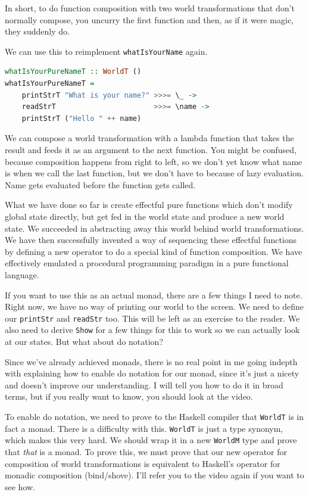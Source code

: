 \documentclass[11pt]{article}
\begin{document}
In short, to do function composition with two world transformations that don't
normally compose, you uncurry the first function and then, as if it were magic,
they suddenly do.

We can use this to reimplement \texttt{whatIsYourName} again.
\begin{lstlisting}[language=Haskell]
whatIsYourPureNameT :: WorldT ()
whatIsYourPureNameT =
    printStrT "What is your name?" >>>= \_ ->
    readStrT                       >>>= \name ->
    printStrT ("Hello " ++ name)
\end{lstlisting}
We can compose a world transformation with a lambda function that takes the result
and feeds it as an argument to the next function. You might be confused,
because composition happens from right to left, so we don't yet know what name
is when we call the last function, but we don't have to because of lazy
evaluation. Name gets evaluated before the function gets called.

What we have done so far is create effectful pure functions which don't modify
global state directly, but get fed in the world state and produce a new world
state. We succeeded in abstracting away this world behind world
transformations. We have then successfully invented a way of sequencing these
effectful functions by defining a new operator to do a special kind of function
composition. We have effectively emulated a procedural programming paradigm in
a pure functional language.

If you want to use this as an actual monad, there are a few things I need to
note. Right now, we have no way of printing our world to the screen. We need to
define our \texttt{printStr} and \texttt{readStr} too. This will be left as an
exercise to the reader. We also need to derive \texttt{Show} for a few things
for this to work so we can actually look at our states. But what about do
notation?

Since we've already achieved monads, there is no real point in me going indepth
with explaining how to enable do notation for our monad, since it's just a
nicety and doesn't improve our understanding. I will tell you how to do it in
broad terms, but if you really want to know, you should look at the
\textcite{tsmonad} video.

To enable do notation, we need to prove to the Haskell compiler that
\texttt{WorldT} is in fact a monad. There is a difficulty with this.
\texttt{WorldT} is just a type synonym, which makes this very hard. We should
wrap it in a new \texttt{WorldM} type and prove that \emph{that} is a monad. To
prove this, we must prove that our new operator for composition of world
transformations is equivalent to Haskell's operator for monadic composition
(bind/shove). I'll refer you to the video again if you want to see how.
\end{document}
